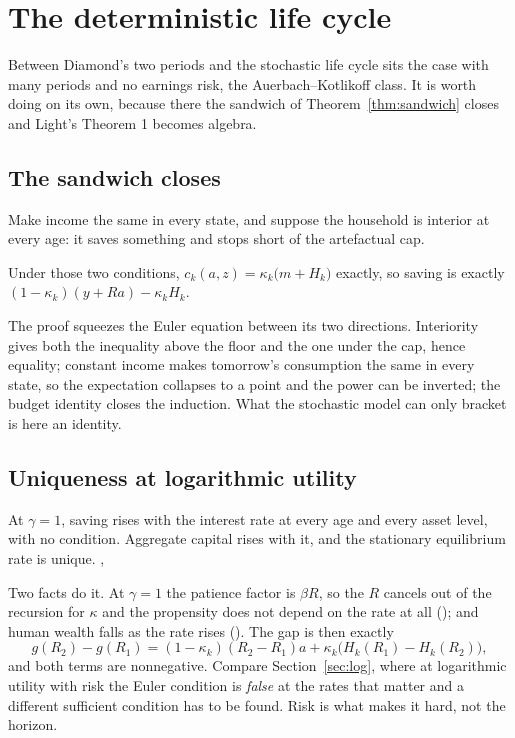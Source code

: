 \section{The deterministic life cycle}\label{sec:det}

Between Diamond's two periods and the stochastic life cycle sits the case with many periods and no
earnings risk, the Auerbach--Kotlikoff class. It is worth doing on its own, because there the
sandwich of Theorem~\ref{thm:sandwich} closes and Light's Theorem 1 becomes algebra.

\subsection{The sandwich closes}

Make income the same in every state, and suppose the household is interior at every age: it saves
something and stops short of the artefactual cap.

\begin{theorem}\label{thm:detclosed}
Under those two conditions, $c_k(a,z)=\kappa_k\bigl(m+H_k\bigr)$ exactly, so saving is exactly
$(1-\kappa_k)(y+Ra)-\kappa_kH_k$.
\end{theorem}

The proof squeezes the Euler equation between its two directions. Interiority gives both the
inequality above the floor and the one under the cap, hence equality; constant income makes
tomorrow's consumption the same in every state, so the expectation collapses to a point and the
power can be inverted; the budget identity closes the induction. What the stochastic model can
only bracket is here an identity.

\subsection{Uniqueness at logarithmic utility}

\begin{theorem}\label{thm:detlog}
At $\gamma=1$, saving rises with the interest rate at every age and every asset level, with no
condition. Aggregate capital rises with it, and the stationary equilibrium rate is unique.
,
\end{theorem}

Two facts do it. At $\gamma=1$ the patience factor is $\beta R$, so the $R$ cancels out of the
recursion for $\kappa$ and the propensity does not depend on the rate at all
(); and human wealth falls as the rate rises
(). The gap is then exactly
\[
  g(R_2)-g(R_1)=(1-\kappa_k)(R_2-R_1)a+\kappa_k\bigl(H_k(R_1)-H_k(R_2)\bigr),
\]
and both terms are nonnegative. Compare Section~\ref{sec:log}, where at logarithmic utility with
risk the Euler condition is \emph{false} at the rates that matter and a different sufficient
condition has to be found. Risk is what makes it hard, not the horizon.

